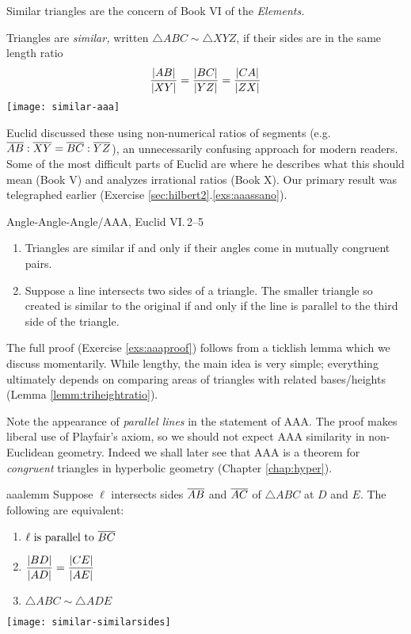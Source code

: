 
Similar triangles are the concern of Book VI of the \emph{Elements.}

\begin{defn}[lower separated=false, sidebyside, sidebyside align=top seam, sidebyside gap=0pt, righthand width=0.32\linewidth]{}{}
Triangles are \emph{similar,} written $\triangle ABC\sim\triangle XYZ$, if their sides are in the same length ratio
\[\frac{\left| AB\right|}{\left| XY\right|}=\frac{\left| BC\right|}{\left| YZ\right|}=\frac{\left| CA\right|}{\left| ZX\right|}\]
\tcblower
\flushright\texttt{[image: similar-aaa]}
\end{defn}

Euclid discussed these using non-numerical ratios of segments (e.g.{} $\overline{AB}:\overline{XY}=\overline{BC}:\overline{YZ}$), an unnecessarily confusing approach for modern readers. Some of the most difficult parts of Euclid are where he describes what this should mean (Book V) and analyzes irrational ratios (Book X).\medbreak
Our primary result was telegraphed earlier (Exercise \ref*{sec:hilbert2}.\ref{exs:aaassano}).

\begin{thm}{Angle-Angle-Angle/AAA, Euclid VI.\,2--5}{}
\begin{enumerate}
  \item Triangles are similar if and only if their angles come in mutually congruent pairs.
  \item Suppose a line intersects two sides of a triangle. The smaller triangle so created is similar to the original if and only if the line is parallel to the third side of the triangle.
\end{enumerate}
\end{thm}

The full proof (Exercise \ref{exs:aaaproof}) follows from a ticklish lemma which we discuss momentarily. While lengthy, the main idea is very simple; everything ultimately depends on comparing areas of triangles with related bases/heights (Lemma \ref{lemm:triheightratio}).\smallbreak

Note the appearance of \emph{parallel lines} in the statement of AAA. The proof makes liberal use of Playfair's axiom, so we should not expect AAA similarity in non-Euclidean geometry. Indeed we shall later see that AAA is a theorem for \emph{congruent} triangles in hyperbolic geometry (Chapter \ref{chap:hyper}).


\goodbreak

\begin{lemm}[lower separated=false, sidebyside, sidebyside align=top seam, sidebyside gap=0pt, righthand width=0.43\linewidth]{}{aaalemm}
Suppose $\ell$ intersects sides $\overline{AB}$ and $\overline{AC}$ of $\triangle ABC$ at $D$ and $E$. The following are equivalent:
\begin{enumerate}
  \item $\ell\text{ is parallel to }\overline{BC}$
  \item $\displaystyle\frac{\left| BD\right|}{\left| AD\right|}=\frac{\left| CE\right|}{\left| AE\right|}$
  \item $\triangle ABC\sim\triangle ADE$
\end{enumerate}
\tcblower\flushright\texttt{[image: similar-similarsides]}
\end{lemm}

